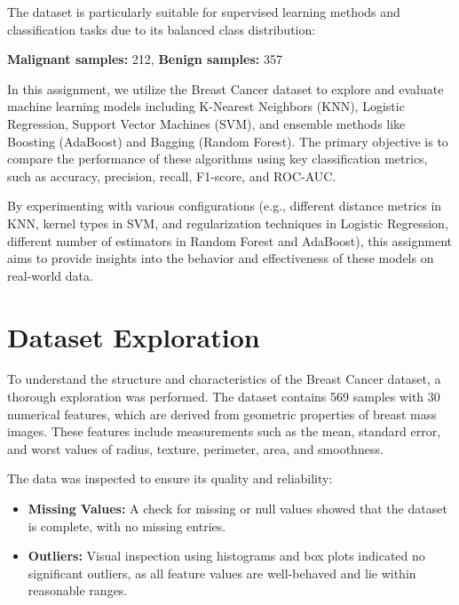 \documentclass[12pt]{article}
\begin{document}
The dataset is particularly suitable for supervised learning methods and classification tasks due to its balanced class distribution:

\textbf{Malignant samples:} 212, \textbf{Benign samples:} 357


In this assignment, we utilize the Breast Cancer dataset to explore and evaluate machine learning models including K-Nearest Neighbors (KNN), Logistic Regression, Support Vector Machines (SVM), and ensemble methods like Boosting (AdaBoost) and Bagging (Random Forest). The primary objective is to compare the performance of these algorithms using key classification metrics, such as accuracy, precision, recall, F1-score, and ROC-AUC.

By experimenting with various configurations (e.g., different distance metrics in KNN, kernel types in SVM, and regularization techniques in Logistic Regression, different number of estimators in Random Forest and AdaBoost), this assignment aims to provide insights into the behavior and effectiveness of these models on real-world data.





\section{Dataset Exploration}


To understand the structure and characteristics of the Breast Cancer dataset, a thorough exploration was performed. The dataset contains 569 samples with 30 numerical features, which are derived from geometric properties of breast mass images. These features include measurements such as the mean, standard error, and worst values of radius, texture, perimeter, area, and smoothness.

The data was inspected to ensure its quality and reliability:
\begin{itemize}
    \item \textbf{Missing Values:} A check for missing or null values showed that the dataset is complete, with no missing entries.
    \item \textbf{Outliers:} Visual inspection using histograms and box plots indicated no significant outliers, as all feature values are well-behaved and lie within reasonable ranges.
\end{itemize}
\end{document}
